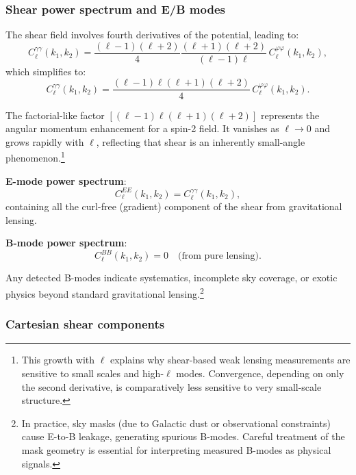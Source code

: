 \subsubsection{Shear power spectrum and E/B modes}

The shear field involves fourth derivatives of the potential, leading to:
\begin{equation}
C_\ell^{\gamma\gamma}(k_1, k_2) = \frac{(\ell-1)(\ell+2)}{4} \frac{(\ell+1)(\ell+2)}{(\ell-1)\ell} \, C_\ell^{\varphi\varphi}(k_1, k_2),
\label{eq:shear_power_intermediate}
\end{equation}
which simplifies to:
\begin{equation}
C_\ell^{\gamma\gamma}(k_1, k_2) = \frac{(\ell-1)\ell(\ell+1)(\ell+2)}{4} \, C_\ell^{\varphi\varphi}(k_1, k_2).
\label{eq:shear_power_final}
\end{equation}

The factorial-like factor $[(\ell-1)\ell(\ell+1)(\ell+2)]$ represents the angular momentum enhancement for a spin-2 field.
It vanishes as $\ell \to 0$ and grows rapidly with $\ell$, reflecting that shear is an inherently small-angle phenomenon.\footnote{This
growth with $\ell$ explains why shear-based weak lensing measurements are sensitive to small scales and high-$\ell$ modes. Convergence,
depending on only the second derivative, is comparatively less sensitive to very small-scale structure.}

\textbf{E-mode power spectrum}:
\begin{equation}
C_\ell^{EE}(k_1, k_2) = C_\ell^{\gamma\gamma}(k_1, k_2),
\label{eq:e_mode_power}
\end{equation}
containing all the curl-free (gradient) component of the shear from gravitational lensing.

\textbf{B-mode power spectrum}:
\begin{equation}
C_\ell^{BB}(k_1, k_2) = 0 \quad \text{(from pure lensing)}.
\label{eq:b_mode_power_lensing}
\end{equation}

Any detected B-modes indicate systematics, incomplete sky coverage, or exotic physics beyond standard gravitational lensing.\footnote{In
practice, sky masks (due to Galactic dust or observational constraints) cause E-to-B leakage, generating spurious B-modes. Careful
treatment of the mask geometry is essential for interpreting measured B-modes as physical signals.}

\subsubsection{Cartesian shear components}

